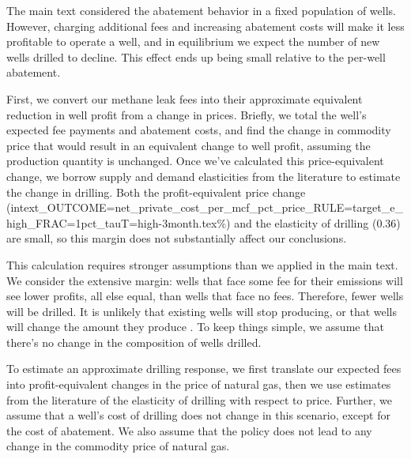 The main text considered the abatement behavior in a fixed population of wells.
However, charging additional fees and increasing abatement costs will make it less profitable to operate a well, and in equilibrium we expect the number of new wells drilled to decline.
This effect ends up being small relative to the per-well abatement.

First, we convert our methane leak fees into their approximate equivalent reduction in well profit from a change in prices.
Briefly, we total the well's expected fee payments and abatement costs, and find the change in commodity price that would result in an equivalent change to well profit, assuming the production quantity is unchanged.
Once we've calculated this price-equivalent change, we borrow supply and demand elasticities from the literature to estimate the change in drilling.
Both the profit-equivalent price change
({intext_OUTCOME=net_private_cost_per_mcf_pct_price_RULE=target_e_high_FRAC=1pct_tauT=high-3month.tex}\%)
and the elasticity of drilling (0.36) are small, so this margin does not substantially affect our conclusions.

This calculation requires stronger assumptions than we applied in the main text.
We consider the extensive margin: wells that face some fee for their emissions will see lower profits, all else equal, than wells that face no fees.
Therefore, fewer wells will be drilled.
It is unlikely that existing wells will stop producing, or that wells will change the amount they produce \parencite{Anderson/Kellogg/Salant:2018}.
To keep things simple, we assume that there's no change in the composition of wells drilled.

To estimate an approximate drilling response, we first translate our expected fees into profit-equivalent changes in the price of natural gas, then we use estimates from the literature of the elasticity of drilling with respect to price.
Further, we assume that a well's cost of drilling does not change in this scenario, except for the cost of abatement.
We also assume that the policy does not lead to any change in the commodity price of natural gas.

